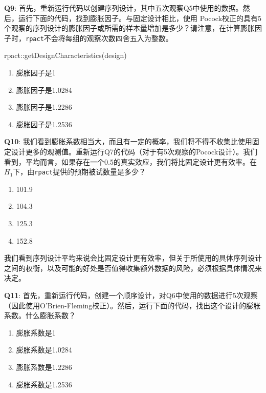 \documentclass[
  letterpaper,
  DIV=11,
  numbers=noendperiod]{scrreprt}
\newenvironment{Shaded}{\begin{snugshade}}{\end{snugshade}}
\newcommand{\FunctionTok}[1]{\textcolor[rgb]{0.28,0.35,0.67}{#1}}
\newcommand{\NormalTok}[1]{\textcolor[rgb]{0.00,0.23,0.31}{#1}}
\newcommand{\SpecialCharTok}[1]{\textcolor[rgb]{0.37,0.37,0.37}{#1}}
\providecommand{\tightlist}{%
  \setlength{\itemsep}{0pt}\setlength{\parskip}{0pt}}\usepackage{longtable,booktabs,array}
\begin{document}
\textbf{Q9}:
首先，重新运行代码以创建序列设计，其中五次观察Q5中使用的数据。然后，运行下面的代码，找到膨胀因子。与固定设计相比，使用
Pocock校正的具有5个观察的序列设计的膨胀因子或所需的样本量增加是多少？请注意，在计算膨胀因子时，\texttt{rpact}不会将每组的观察次数四舍五入为整数。

\begin{Shaded}
\begin{Highlighting}[]
\NormalTok{rpact}\SpecialCharTok{::}\FunctionTok{getDesignCharacteristics}\NormalTok{(design)}
\end{Highlighting}
\end{Shaded}

\begin{enumerate}
\def\labelenumi{\Alph{enumi})}
\tightlist
\item
  膨胀因子是1
\item
  膨胀因子是1.0284
\item
  膨胀因子是1.2286
\item
  膨胀因子是1.2536
\end{enumerate}

\textbf{Q10}:
我们看到膨胀系数相当大，而且有一定的概率，我们将不得不收集比使用固定设计更多的观测值。重新运行Q7的代码（对于有5次观察的Pocock设计）。我们看到，平均而言，如果存在一个0.5的真实效应，我们将比固定设计更有效率。在\(H_1\)下，由\texttt{rpact}提供的预期被试数量是多少？

\begin{enumerate}
\def\labelenumi{\Alph{enumi})}
\tightlist
\item
  101.9
\item
  104.3
\item
  125.3
\item
  152.8
\end{enumerate}

我们看到序列设计平均来说会比固定设计更有效率，但关于所使用的具体序列设计之间的权衡，以及可能的好处是否值得收集额外数据的风险，必须根据具体情况来决定。

\textbf{Q11}:
首先，重新运行代码，创建一个顺序设计，对Q6中使用的数据进行5次观察（因此使用O'Brien-Fleming校正）。然后，运行下面的代码，找出这个设计的膨胀系数。什么膨胀系数？

\begin{enumerate}
\def\labelenumi{\Alph{enumi})}
\tightlist
\item
  膨胀系数是1
\item
  膨胀系数是1.0284
\item
  膨胀系数是1.2286
\item
  膨胀系数是1.2536
\end{enumerate}
\end{document}
